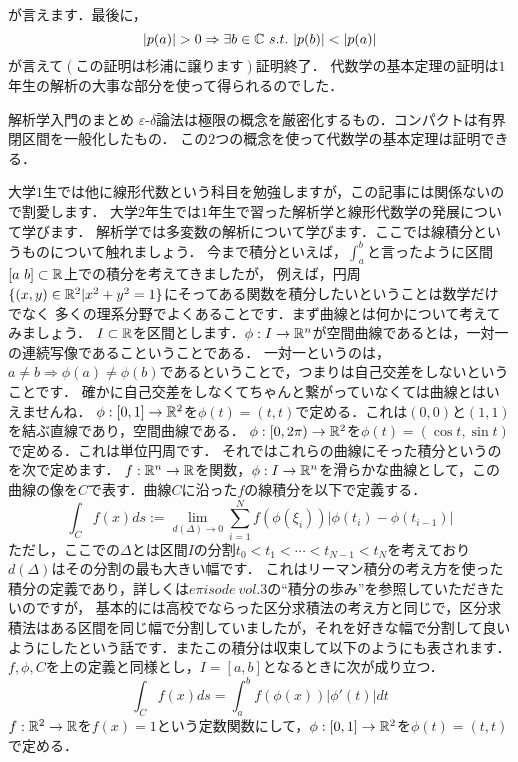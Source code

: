 が言えます．最後に，
\[
|p(a)|>0 \Rightarrow \exists b \in \C \ s.t. \ |p(b)| < |p(a)|
\]
が言えて$(この証明は杉浦に譲ります)$証明終了．
\proofx
代数学の基本定理の証明は$1$年生の解析の大事な部分を使って得られるのでした．
\begin{itembox}[l]{解析学入門のまとめ}
$\varepsilon$-$\delta$論法は極限の概念を厳密化するもの．コンパクトは有界閉区間を一般化したもの．
この$2$つの概念を使って代数学の基本定理は証明できる．
\end{itembox}
大学$1$生では他に線形代数という科目を勉強しますが，この記事には関係ないので割愛します．
大学$2$年生では$1$年生で習った解析学と線形代数学の発展について学びます．
解析学では多変数の解析について学びます．ここでは線積分というものについて触れましょう．
今まで積分といえば，$\int_a^b$と言ったように区間$[a\ b]\subset \mathbb R$上での積分を考えてきましたが，
例えば，円周$\{(x,y)\in\mathbb R^2 | x^2+y^2=1\}$にそってある関数を積分したいということは数学だけでなく
多くの理系分野でよくあることです．まず曲線とは何かについて考えてみましょう．
$I\subset\mathbb R$を区間とします．$\phi:I \to \mathbb R^n$が空間曲線であるとは，一対一の連続写像であるこということである．
一対一というのは，$a\neq b \Rightarrow \phi(a) \neq \phi(b)$であるということで，つまりは自己交差をしないということです．
確かに自己交差をしなくてちゃんと繋がっていなくては曲線とはいえませんね．
\ex
$\phi:[0,1] \to \mathbb R^2$を$\phi(t)=(t,t)$で定める．これは$(0,0)$と$(1,1)$を結ぶ直線であり，空間曲線である．
\exx
\ex
$\phi:[0,2\pi) \to \mathbb R^2$を$\phi(t)=(\cos t ,\sin t)$で定める．これは単位円周です．
\exx
それではこれらの曲線にそった積分というのを次で定めます．
$f:\mathbb R^n \to \mathbb R$を関数，$\phi:I\to\mathbb R^n$を滑らかな曲線として，この曲線の像を$C$で表す．曲線$C$に沿った$f$の線積分を以下で定義する．
\[
\int_C f(x)ds := \lim_{d(\Delta)\to 0} \sum_{i=1}^N f(\phi(\xi_i)) |\phi(t_i) - \phi(t_{i-1})|
\]
ただし，ここでの$\Delta$とは区間$I$の分割$t_0 < t_1 < \cdots < t_{N-1} < t_N$を考えており$d(\Delta)$はその分割の最も大きい幅です．
これはリーマン積分の考え方を使った積分の定義であり，詳しくは$e\pi isode\ vol.3$の``積分の歩み''を参照していただきたいのですが，
基本的には高校でならった区分求積法の考え方と同じで，区分求積法はある区間を同じ幅で分割していましたが，それを好きな幅で分割して良いようにしたという話です．またこの積分は収束して以下のようにも表されます．
\prop
$f,\phi,C$を上の定義と同様とし，$I=[a,b]$となるときに次が成り立つ．
\[
\int_C f(x) ds = \int_a^b f(\phi(x))|\phi'(t)|dt
\]
\propx
\ex
$f:\mathbb R^2\to\mathbb R$を$f(x)=1$という定数関数にして，$\phi:[0,1] \to \mathbb R^2$を$\phi(t)=(t,t)$で定める．\\
